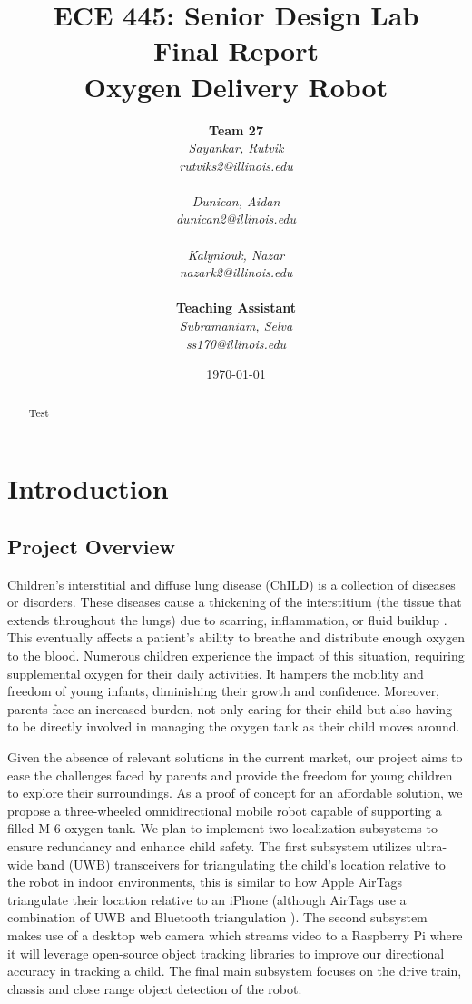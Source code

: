 \documentclass{report}
\title{ECE 445: Senior Design Lab \\ Final Report \\ Oxygen Delivery Robot} %
\author {
    \textbf{Team 27} \\ 
    \textit{Sayankar, Rutvik}\\
    \textit{rutviks2@illinois.edu} \\
    \hfill \\ 
    \textit{Dunican, Aidan}\\
    \textit{dunican2@illinois.edu} \\
    \hfill \\ 
    \textit{Kalyniouk, Nazar}\\
    \textit{nazark2@illinois.edu} \\
    \hfill \\ 
    \textbf{Teaching Assistant} \\ 
    \textit{Subramaniam, Selva} \\
    \textit{ss170@illinois.edu} 
}
\date{\today} %
\begin{document}
    \maketitle %

    \begin{abstract}
        Test
    \end{abstract}
    
    \pagebreak
    \tableofcontents %
    \pagebreak

    \chapter{Introduction}
    \section{Project Overview}
    Children's interstitial and diffuse lung disease (ChILD) is a collection of diseases or disorders. These diseases cause a thickening of the interstitium (the tissue that extends throughout the lungs) due to scarring, inflammation, or fluid buildup \cite{ChILD-2022}. This eventually affects a patient’s ability to breathe and distribute enough oxygen to the blood. Numerous children experience the impact of this situation, requiring supplemental oxygen for their daily activities. It hampers the mobility and freedom of young infants, diminishing their growth and confidence. Moreover, parents face an increased burden, not only caring for their child but also having to be directly involved in managing the oxygen tank as their child moves around.

    Given the absence of relevant solutions in the current market, our project aims to ease the challenges faced by parents and provide the freedom for young children to explore their surroundings. As a proof of concept for an affordable solution, we propose a three-wheeled omnidirectional mobile robot capable of supporting a filled M-6 oxygen tank. We plan to implement two localization subsystems to ensure redundancy and enhance child safety. The first subsystem utilizes ultra-wide band (UWB) transceivers for triangulating the child's location relative to the robot in indoor environments, this is similar to how Apple AirTags triangulate their location relative to an iPhone \cite{airtag_uwb} (although AirTags use a combination of UWB and Bluetooth triangulation \cite{airtag_ble}). The second subsystem makes use of a desktop web camera which streams video to a Raspberry Pi where it will leverage open-source object tracking libraries to improve our directional accuracy in tracking a child. The final main subsystem focuses on the drive train, chassis and close range object detection of the robot.
\end{document}
